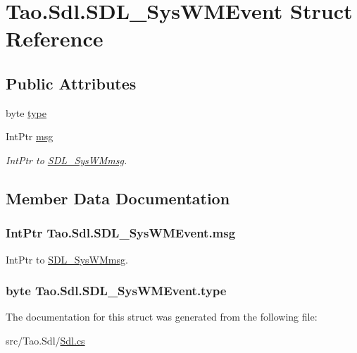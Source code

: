 \hypertarget{struct_tao_1_1_sdl_1_1_s_d_l___sys_w_m_event}{
\section{Tao.Sdl.SDL\_\-SysWMEvent Struct Reference}
\label{struct_tao_1_1_sdl_1_1_s_d_l___sys_w_m_event}
}
\subsection*{Public Attributes}
\begin{DoxyCompactItemize}
\item 
byte \hyperlink{struct_tao_1_1_sdl_1_1_s_d_l___sys_w_m_event_aed5a1f1ebec79de1b8324c3721ce881b}{type}
\item 
IntPtr \hyperlink{struct_tao_1_1_sdl_1_1_s_d_l___sys_w_m_event_a0a9113d5c701abc8d76e1439f6c3bbf7}{msg}
\begin{DoxyCompactList}\small\item\em IntPtr to \hyperlink{struct_s_d_l___sys_w_mmsg}{SDL\_\-SysWMmsg}. \item\end{DoxyCompactList}\end{DoxyCompactItemize}


\subsection{Member Data Documentation}
\hypertarget{struct_tao_1_1_sdl_1_1_s_d_l___sys_w_m_event_a0a9113d5c701abc8d76e1439f6c3bbf7}{
\subsubsection[{msg}]{\setlength{\rightskip}{0pt plus 5cm}IntPtr {\bf Tao.Sdl.SDL\_\-SysWMEvent.msg}}}
\label{struct_tao_1_1_sdl_1_1_s_d_l___sys_w_m_event_a0a9113d5c701abc8d76e1439f6c3bbf7}


IntPtr to \hyperlink{struct_s_d_l___sys_w_mmsg}{SDL\_\-SysWMmsg}. 

\hypertarget{struct_tao_1_1_sdl_1_1_s_d_l___sys_w_m_event_aed5a1f1ebec79de1b8324c3721ce881b}{
\subsubsection[{type}]{\setlength{\rightskip}{0pt plus 5cm}byte {\bf Tao.Sdl.SDL\_\-SysWMEvent.type}}}
\label{struct_tao_1_1_sdl_1_1_s_d_l___sys_w_m_event_aed5a1f1ebec79de1b8324c3721ce881b}


The documentation for this struct was generated from the following file:\begin{DoxyCompactItemize}
\item 
src/Tao.Sdl/\hyperlink{_sdl_8cs}{Sdl.cs}\end{DoxyCompactItemize}
